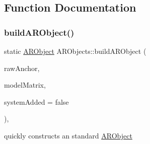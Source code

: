 \subsection{Function Documentation}
\mbox{\label{namespace_a_r_objects_a3721dd2b55c8de28aa62371a1d345a83}} 
\subsubsection{\texorpdfstring{build\+A\+R\+Object()}{buildARObject()}}
{\footnotesize\ttfamily static \hyperlink{struct_a_r_objects_1_1_a_r_object}{A\+R\+Object} A\+R\+Objects\+::build\+A\+R\+Object (\begin{DoxyParamCaption}\item[{A\+R\+Anchor $\ast$}]{raw\+Anchor,  }\item[{of\+Matrix4x4}]{model\+Matrix,  }\item[{bool}]{system\+Added = {\ttfamily false} }\end{DoxyParamCaption})\hspace{0.3cm}{\ttfamily [inline]}, {\ttfamily [static]}}



quickly constructs an standard \hyperlink{struct_a_r_objects_1_1_a_r_object}{A\+R\+Object} 

